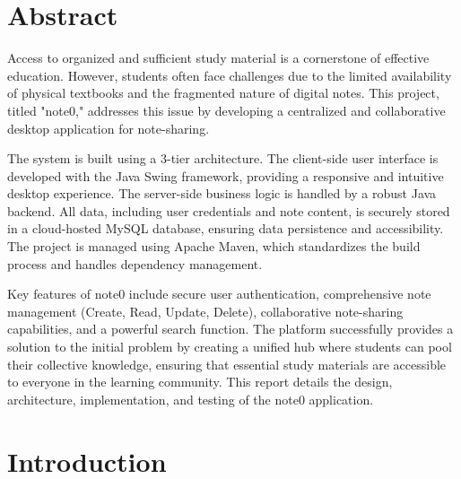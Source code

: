 \documentclass[12pt, a4paper]{report}
\begin{document}
\newpage
\chapter*{Abstract}

Access to organized and sufficient study material is a cornerstone of effective education. However, students often face challenges due to the limited availability of physical textbooks and the fragmented nature of digital notes. This project, titled "note0," addresses this issue by developing a centralized and collaborative desktop application for note-sharing.

The system is built using a 3-tier architecture. The client-side user interface is developed with the Java Swing framework, providing a responsive and intuitive desktop experience. The server-side business logic is handled by a robust Java backend. All data, including user credentials and note content, is securely stored in a cloud-hosted MySQL database, ensuring data persistence and accessibility. The project is managed using Apache Maven, which standardizes the build process and handles dependency management.

Key features of note0 include secure user authentication, comprehensive note management (Create, Read, Update, Delete), collaborative note-sharing capabilities, and a powerful search function. The platform successfully provides a solution to the initial problem by creating a unified hub where students can pool their collective knowledge, ensuring that essential study materials are accessible to everyone in the learning community. This report details the design, architecture, implementation, and testing of the note0 application.

\newpage


\tableofcontents
\newpage
\listoffigures
\newpage
\listoftables
\newpage
{} %



\chapter{Introduction}
\end{document}
